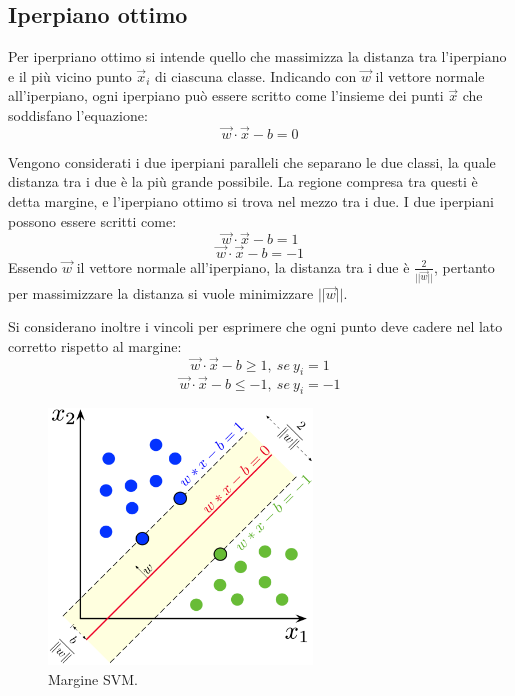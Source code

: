 \documentclass[oneside]{book}
\begin{document}


\subsection{Iperpiano ottimo}
Per iperpriano ottimo si intende quello che massimizza la distanza tra l'iperpiano e il più vicino punto $\vec{x}_i$ di ciascuna classe. Indicando con $\vec{w}$ il vettore normale all'iperpiano, ogni iperpiano può essere scritto come l'insieme dei punti $\vec{x}$ che soddisfano l'equazione:
$$\vec{w}\cdot\vec{x} - b = 0$$

Vengono considerati i due iperpiani paralleli che separano le due classi, la quale distanza tra i due è la più grande possibile. La regione compresa tra questi è detta margine, e l'iperpiano ottimo si trova nel mezzo tra i due. I due iperpiani possono essere scritti come:
$$\vec{w}\cdot\vec{x} - b = 1$$
$$\vec{w}\cdot\vec{x} - b = - 1$$
Essendo $\vec{w}$ il vettore normale all'iperpiano, la distanza tra i due è $\frac{2}{||\vec{w}||}$, pertanto per massimizzare la distanza si vuole minimizzare $ ||\vec{w}||$.

Si considerano inoltre i vincoli per esprimere che ogni punto deve cadere nel lato corretto rispetto al margine:
$$\vec{w}\cdot\vec{x} - b \geq 1,\ se\ y_i = 1$$
$$\vec{w}\cdot\vec{x} - b \leq - 1,\ se\ y_i = -1$$


\begin{figure}[h!]
	\centering
	\includegraphics[width=7cm]{assets/svm-margin.png}
	\caption[Caption for LOF]{Margine SVM.\footnotemark}
	\label{fig:svm-margin}
\end{figure}

\end{document}

